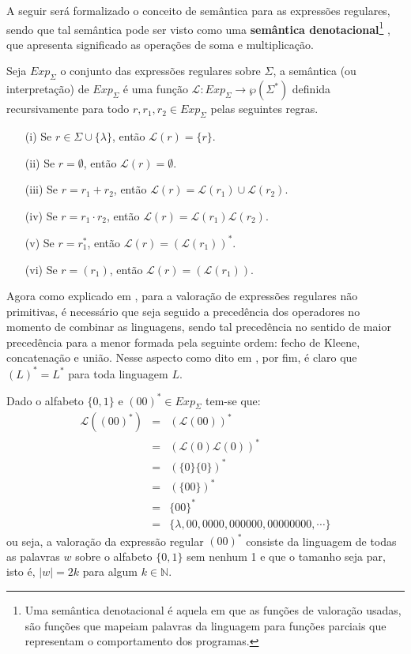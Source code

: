 A seguir será formalizado o conceito de semântica para as expressões regulares, sendo que tal semântica pode ser visto como uma \textbf{semântica denotacional}\footnote{Uma semântica denotacional é aquela em que as funções de valoração usadas, são funções que mapeiam palavras da linguagem para funções parciais que representam o comportamento dos programas.} \cite{scott1971}, que apresenta significado as operações de soma e multiplicação.

\begin{definicao}\label{def:ExpRegularesSemantica}
	Seja $Exp_\Sigma$ o conjunto das expressões regulares sobre $\Sigma$,  a semântica (ou interpretação) de $Exp_\Sigma$ é uma função $\mathcal{L}: Exp_\Sigma \rightarrow \wp(\Sigma^*)$ definida recursivamente para todo $r, r_1, r_2  \in Exp_\Sigma$ pelas seguintes regras.
	\begin{itemize}
		\item[(i)] Se $r \in \Sigma \cup \{\lambda\}$, então $\mathcal{L}(r) = \{r\}$.
		\item[(ii)] Se $r = \emptyset$, então $\mathcal{L}(r) = \emptyset$.
		\item[(iii)] Se $r = r_1 + r_2$, então $\mathcal{L}(r) = \mathcal{L}(r_1) \cup \mathcal{L}(r_2)$.
		\item[(iv)] Se $r = r_1 \cdot r_2$, então $\mathcal{L}(r) = \mathcal{L}(r_1)\mathcal{L}(r_2)$.
		\item[(v)] Se $r = r_1^*$, então $\mathcal{L}(r) = (\mathcal{L}(r_1))^*$.
		\item[(vi)] Se $r = (r_1)$, então $\mathcal{L}(r) = (\mathcal{L}(r_1))$.	
	\end{itemize}
\end{definicao}

Agora como explicado em \cite{carroll1989}, para a valoração de expressões regulares não primitivas, é necessário que seja seguido a precedência dos operadores no momento de combinar as linguagens, sendo tal precedência no sentido de maior precedência para a menor formada pela seguinte ordem: fecho de Kleene, concatenação e união. Nesse aspecto como dito em \cite{menezes1998LFA}, por fim, é claro que $(L)^* = L^*$ para toda linguagem $L$.

\begin{exemplo}\label{exe:ValoracaoExpressao1}
	Dado o alfabeto $\{0,1\}$ e $(00)^* \in Exp_\Sigma$ tem-se que:
	\begin{eqnarray*}
		\mathcal{L}((00)^*) & = & (\mathcal{L}(00))^*\\
		& = & (\mathcal{L}(0)\mathcal{L}(0))^*\\
		& = & (\{0\}\{0\})^*\\
		& = & (\{00\})^*\\
		& = & \{00\}^*\\
		& = & \{\lambda, 00, 0000, 000000, 00000000, \cdots\}
	\end{eqnarray*}
	ou seja, a valoração da expressão regular $(00)^*$ consiste da linguagem de todas as palavras $w$ sobre o alfabeto $\{0,1\}$ sem nenhum 1 e que o tamanho seja par, isto é, $|w| = 2k$ para algum $k \in \mathbb{N}$.
\end{exemplo}


